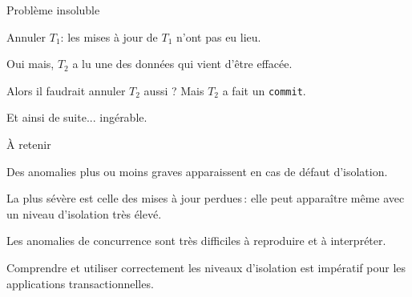 \begin{frame}{Problème insoluble}

Annuler $T_1$: les mises à jour de $T_1$ n'ont pas eu lieu.

\vfill

\alert{Oui mais}, $T_2$ a lu une des données qui vient d'être effacée.

\vfill

Alors il faudrait annuler $T_2$ aussi ? Mais $T_2$ a fait un \texttt{commit}.

\vfill

Et ainsi de suite... ingérable.


\end{frame}


\begin{frame}{À retenir}

Des anomalies plus ou moins graves apparaissent en cas de défaut d'isolation.

\vfill

La plus sévère est celle des \alert{mises à jour perdues}\,: elle peut apparaître même
avec un niveau d'isolation très élevé.

\vfill

Les anomalies de concurrence sont \alert{très difficiles} à reproduire et à interpréter.

\vfill
\begin{blocgauche}
\alert{Comprendre et utiliser correctement les niveaux d'isolation est impératif
pour les applications transactionnelles.}
\end{blocgauche}

\end{frame}

